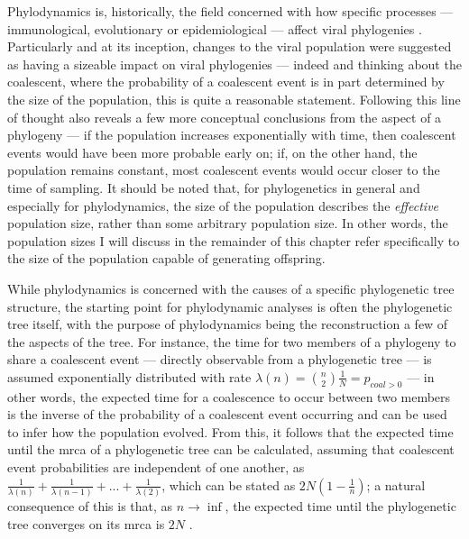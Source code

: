Phylodynamics is, historically, the field concerned with how specific processes --- immunological, evolutionary or epidemiological --- affect viral phylogenies \cite{Volz2013-ey}. Particularly and at its inception, changes to the viral population were suggested as having a sizeable impact on viral phylogenies \cite{Grenfell2004-ip} --- indeed and thinking about the coalescent, where the probability of a coalescent event is in part determined by the size of the population, this is quite a reasonable statement. Following this line of thought also reveals a few more conceptual conclusions from the aspect of a phylogeny --- if the population increases exponentially with time, then coalescent events would have been more probable early on; if, on the other hand, the population remains constant, most coalescent events would occur closer to the time of sampling. It should be noted that, for phylogenetics in general and especially for phylodynamics, the size of the population describes the \textit{effective} population size, rather than some arbitrary population size. In other words, the population sizes I will discuss in the remainder of this chapter refer specifically to the size of the population capable of generating offspring.

While phylodynamics is concerned with the causes of a specific phylogenetic tree structure, the starting point for phylodynamic analyses is often the phylogenetic tree itself, with the purpose of phylodynamics being the reconstruction a few of the aspects of the tree. For instance, the time for two members of a phylogeny to share a coalescent event --- directly observable from a phylogenetic tree --- is assumed exponentially distributed with rate $\lambda(n) = \binom{n}{2}\frac{1}{N} = p_{coal>0}$ --- in other words, the expected time for a coalescence to occur between two members is the inverse of the probability of a coalescent event occurring and can be used to infer how the population evolved. From this, it follows that the expected time until the \ac{mrca} of a phylogenetic tree can be calculated, assuming that coalescent event probabilities are independent of one another, as $\frac{1}{\lambda(n)} + \frac{1}{\lambda(n-1)} + ... + \frac{1}{\lambda(2)}$, which can be stated as $2N(1-\frac{1}{n})$; a natural consequence of this is that, as $n \rightarrow \inf$, the expected time until the phylogenetic tree converges on its \ac{mrca} is $2N$ \cite{Volz2013-ey}. 

